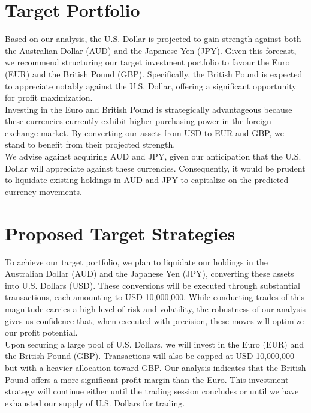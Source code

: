\documentclass{article}
\begin{document}
\section*{Target Portfolio}

Based on our analysis, the U.S. Dollar is projected to gain strength against both the Australian Dollar (AUD) and the Japanese Yen (JPY). Given this forecast, we recommend structuring our target investment portfolio to favour the Euro (EUR) and the British Pound (GBP). Specifically, the British Pound is expected to appreciate notably against the U.S. Dollar, offering a significant opportunity for profit maximization.\\

\noindent Investing in the Euro and British Pound is strategically advantageous because these currencies currently exhibit higher purchasing power in the foreign exchange market. By converting our assets from USD to EUR and GBP, we stand to benefit from their projected strength.\\

\noindent We advise against acquiring AUD and JPY, given our anticipation that the U.S. Dollar will appreciate against these currencies. Consequently, it would be prudent to liquidate existing holdings in AUD and JPY to capitalize on the predicted currency movements.

\section*{Proposed Target Strategies}
To achieve our target portfolio, we plan to liquidate our holdings in the Australian Dollar (AUD) and the Japanese Yen (JPY), converting these assets into U.S. Dollars (USD). These conversions will be executed through substantial transactions, each amounting to USD 10,000,000. While conducting trades of this magnitude carries a high level of risk and volatility, the robustness of our analysis gives us confidence that, when executed with precision, these moves will optimize our profit potential.\\

\noindent Upon securing a large pool of U.S. Dollars, we will invest in the Euro (EUR) and the British Pound (GBP). Transactions will also be capped at USD 10,000,000 but with a heavier allocation toward GBP. Our analysis indicates that the British Pound offers a more significant profit margin than the Euro. This investment strategy will continue either until the trading session concludes or until we have exhausted our supply of U.S. Dollars for trading.
\end{document}
